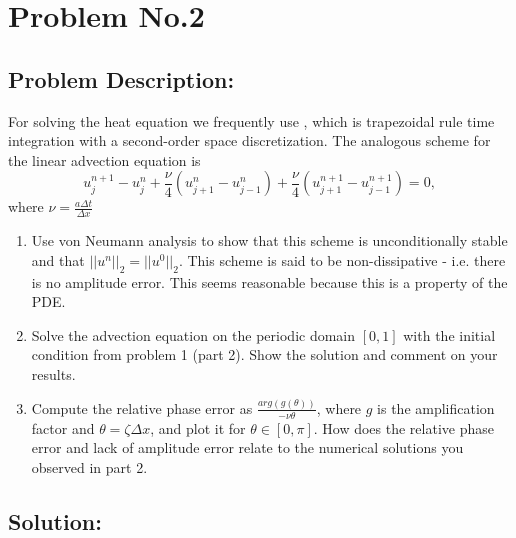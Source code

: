 \section{Problem No.2} \label{sec:prob2}
\subsection{Problem Description:} 
For solving the heat equation we frequently use \protect{\cn}, which is trapezoidal rule time integration with a second-order space discretization. The analogous scheme for the linear advection equation is 
$$
u_{j}^{n+1} - u_{j}^{n} + \frac{\nu}{4}(u_{j+1}^{n}-u_{j-1}^{n}) + \frac{\nu}{4}(u_{j+1}^{n+1}-u_{j-1}^{n+1}) =0,
$$
where $\nu = \frac{a\Delta t}{\Delta x}$
\begin{enumerate}
\item Use von Neumann analysis to show that this scheme is unconditionally stable and that $||u^{n}||_{2} = ||u^{0}||_{2}$. This scheme is said to be non-dissipative - i.e. there is no amplitude error. This seems reasonable because this is a property of the PDE.
\item Solve the advection equation on the periodic domain $[0,1]$ with the initial condition from problem 1 (part 2). Show the solution and comment on your results.
\item Compute the relative phase error as $\frac{arg(g(\theta))}{-\nu \theta}$, where $g$ is the amplification factor and $\theta=\zeta \Delta x$, and plot it for $\theta \in [0,\pi]$. How does the relative phase error and lack of amplitude error relate to the numerical solutions you observed in part 2. 
\end{enumerate}

\subsection{Solution:}
